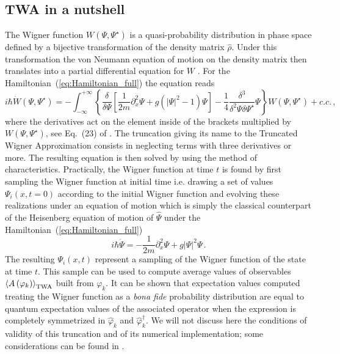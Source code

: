 \documentclass[aps,prd,notitlepage,amsfonts,amssymb,amsmath,nofootinbib,superscriptaddress,longbibliography]{revtex4-2}
\begin{document}
\begin{appendices}
\subsection{TWA in a nutshell}

The Wigner function $W \left( \Psi, \Psi^{\star} \right)$ is a quasi-probability distribution in phase space defined by a bijective transformation of the density matrix $\hat{\rho}$.  Under this transformation the von Neumann equation of motion on the density matrix then translates into a partial differential equation for $W$ \cite{curtrightConciseTreatiseQuantum2014}. For the Hamiltonian~(\ref{eq:Hamiltonian_full}) the equation reads 
\begin{equation}
\label{eq:eom_wigner_function}
    i \hbar \dot{W}\left( \Psi, \Psi^{\star} \right) = - \int_{- \infty}^{+ \infty} \left\{ \frac{\delta}{\delta \Psi} \left[ \frac{1}{2m} \partial^2_{x} \Psi + g \left( \left| \Psi \right|^2 -1 \right) \Psi   \right] - \frac{1}{4} \frac{\delta^3}{\delta^2 \Psi \delta \Psi^{\star}} \Psi \right\} W \left( \Psi, \Psi^{\star} \right)  + c.c. \, ,
\end{equation}
where the derivatives act on the element inside of the brackets multiplied by $W \left( \Psi, \Psi^{\star} \right)$, see Eq.~(23) of \cite{steelDynamicalQuantumNoise1998}. The truncation giving its name to the Truncated Wigner Approximation consists in neglecting terms with three derivatives or more. The resulting equation is then solved by using the method of characteristics. Practically, the Wigner function at time $t$ is found by first sampling the Wigner function at initial time i.e. drawing a set of values $\Psi_i(x,t=0)$ according to the initial Wigner function and evolving these realizations under an equation of motion which is simply the classical counterpart of the Heisenberg equation of motion of $\hat{\Psi}$ under the Hamiltonian~(\ref{eq:Hamiltonian_full})
\begin{equation}
\label{eq:TWA_eom}
    i \hbar \dot{\Psi} = - \frac{1}{2m} \partial^2_{x} \Psi + g  \left| \Psi \right|^2 \Psi   \, .
\end{equation}
The resulting $\Psi_i(x,t)$ represent a sampling of the Wigner function of the state at time $t$. This sample can be used to compute average values of observables $\left \langle A \left(  \varphi_k \right) \right \rangle_{\rm TWA}$ built from $\varphi_k$. It can be shown that expectation values computed treating the Wigner function as a \textit{bona fide} probability distribution are equal to quantum expectation values of the associated operator when the expression is completely symmetrized in $\hat{\varphi}_k$ and $ \hat{\varphi}_k^{\dagger}$. We will not discuss here the conditions of validity of this truncation and of its numerical implementation; some considerations can be found in \cite{Mora_2003,steelDynamicalQuantumNoise1998,Van_Regemortel_2017}.


\end{appendices}
\end{document}
